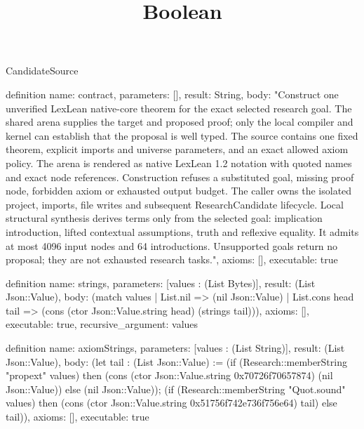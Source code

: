 \begin{lexlean}{CandidateSource}
\title{Boolean}
\begin{semanticmodule}

definition{
 name: contract,
 parameters: [],
 result: String,
 body: "Construct one unverified LexLean native-core theorem for the exact selected research goal. The shared arena supplies the target and proposed proof; only the local compiler and kernel can establish that the proposal is well typed. The source contains one fixed theorem, explicit imports and universe parameters, and an exact allowed axiom policy. The arena is rendered as native LexLean 1.2 notation with quoted names and exact node references. Construction refuses a substituted goal, missing proof node, forbidden axiom or exhausted output budget. The caller owns the isolated project, imports, file writes and subsequent ResearchCandidate lifecycle. Local structural synthesis derives terms only from the selected goal: implication introduction, lifted contextual assumptions, truth and reflexive equality. It admits at most 4096 input nodes and 64 introductions. Unsupported goals return no proposal; they are not exhausted research tasks.",
 axioms: [],
 executable: true
}

definition{
 name: strings,
 parameters: [values : (List Bytes)],
 result: (List Json::Value),
 body: (match values | List.nil => (nil Json::Value) | List.cons head tail => (cons (ctor Json::Value.string head) (strings tail))),
 axioms: [],
 executable: true,
 recursive_argument: values
}

definition{
 name: axiomStrings,
 parameters: [values : (List String)],
 result: (List Json::Value),
 body: (let tail : (List Json::Value) := (if (Research::memberString "propext" values) then (cons (ctor Json::Value.string 0x70726f70657874) (nil Json::Value)) else (nil Json::Value)); (if (Research::memberString "Quot.sound" values) then (cons (ctor Json::Value.string 0x51756f742e736f756e64) tail) else tail)),
 axioms: [],
 executable: true
}


\end{semanticmodule}
\end{lexlean}
